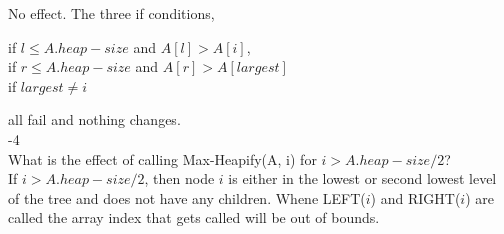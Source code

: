 \documentclass[12pt,largemargins]{homework}
\begin{document}
No effect. The three if conditions,
\begin{center}
if $ l \leq A.heap - size $ and $ A[l] >A[i] $,\\
if $ r \leq A.heap - size $ and $ A[r] > A[largest] $\\
if $ largest \neq i $ \\
\end{center}
all fail and nothing changes.\\

-4\\
What is the effect of calling Max-Heapify(A, i) for $ i > A.heap-size/2$?\\

If $ i > A.heap-size/2 $, then node $ i $ is either in the lowest or second lowest level of the tree and does not have any children. Whene LEFT($ i $) and RIGHT($ i $) are called the array index that gets called will be out of bounds.\\

\question
\end{document}
